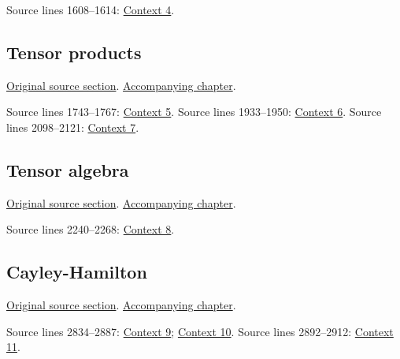 \begin{AlgebraSourceRoutes}
 Source lines 1608--1614: \hyperlink{algebra-context-004}{Context 4}.
\end{AlgebraSourceRoutes}

\subsection{Tensor products}
\hypertarget{algebra-source-section-tensor-product}{}
\noindent\href{https://github.com/stacks/stacks-project/blob/a04446e57ec1fbc252a871afcec7752fb2807b14/algebra.tex\#L1702}{Original source section}. \href{algebra.pdf\#nameddest=section-tensor-product}{Accompanying chapter}.

\begin{AlgebraSourceRoutes}
 Source lines 1743--1767: \hyperlink{algebra-context-005}{Context 5}.
 Source lines 1933--1950: \hyperlink{algebra-context-006}{Context 6}.
 Source lines 2098--2121: \hyperlink{algebra-context-007}{Context 7}.
\end{AlgebraSourceRoutes}

\subsection{Tensor algebra}
\hypertarget{algebra-source-section-tensor-algebra}{}
\noindent\href{https://github.com/stacks/stacks-project/blob/a04446e57ec1fbc252a871afcec7752fb2807b14/algebra.tex\#L2164}{Original source section}. \href{algebra.pdf\#nameddest=section-tensor-algebra}{Accompanying chapter}.

\begin{AlgebraSourceRoutes}
 Source lines 2240--2268: \hyperlink{algebra-context-008}{Context 8}.
\end{AlgebraSourceRoutes}

\subsection{Cayley-Hamilton}
\hypertarget{algebra-source-section-cayley-hamilton}{}
\noindent\href{https://github.com/stacks/stacks-project/blob/a04446e57ec1fbc252a871afcec7752fb2807b14/algebra.tex\#L2806}{Original source section}. \href{algebra.pdf\#nameddest=section-cayley-hamilton}{Accompanying chapter}.

\begin{AlgebraSourceRoutes}
 Source lines 2834--2887: \hyperlink{algebra-context-009}{Context 9}; \hyperlink{algebra-context-010}{Context 10}.
 Source lines 2892--2912: \hyperlink{algebra-context-011}{Context 11}.
\end{AlgebraSourceRoutes}

